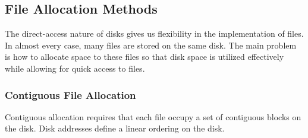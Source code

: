 \subsection{File Allocation Methods}\label{subsec:File_Allocation_Methods}
The direct-access nature of disks gives us flexibility in the implementation of files.
In almost every case, many files are stored on the same disk.
The main problem is how to allocate space to these files so that disk space is utilized effectively while allowing for quick access to files.

\subsubsection{Contiguous File Allocation}\label{subsubsec:Contiguous_File_Allocation}
Contiguous allocation requires that each file occupy a set of contiguous blocks on the disk.
Disk addresses define a linear ordering on the disk.


